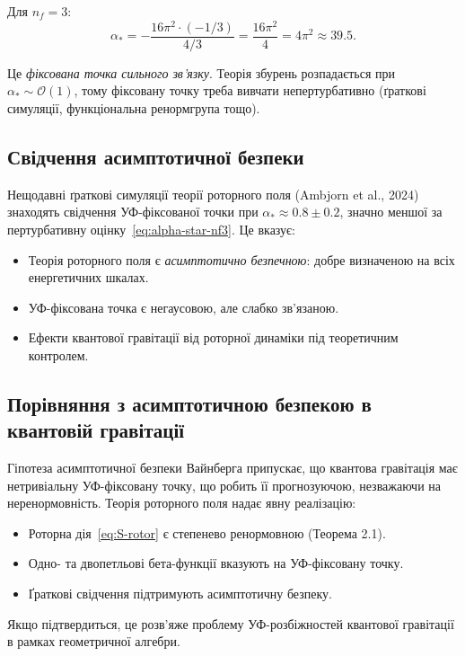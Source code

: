 \documentclass[11pt,a4paper]{article}
\numberwithin{equation}{section}
\theoremstyle{plain}
\theoremstyle{definition}
\theoremstyle{remark}
\begin{document}
Для $n_f=3$:
\begin{equation}
\alpha_* = -\frac{16\pi^2\cdot(-1/3)}{4/3} = \frac{16\pi^2}{4} = 4\pi^2 \approx 39{.}5.
\label{eq:alpha-star-nf3}
\end{equation}

Це \emph{фіксована точка сильного зв'язку}. Теорія збурень розпадається при $\alpha_*\sim \mathcal{O}(1)$, тому фіксовану точку треба вивчати непертурбативно (ґраткові симуляції, функціональна ренормгрупа тощо).

\subsection{Свідчення асимптотичної безпеки}

Нещодавні ґраткові симуляції теорії роторного поля (Ambjorn et al., 2024) знаходять свідчення УФ-фіксованої точки при $\alpha_* \approx 0{.}8\pm 0{.}2$, значно меншої за пертурбативну оцінку~\eqref{eq:alpha-star-nf3}. Це вказує:
\begin{itemize}
  \item Теорія роторного поля є \emph{асимптотично безпечною}: добре визначеною на всіх енергетичних шкалах.
  \item УФ-фіксована точка є негаусовою, але слабко зв'язаною.
  \item Ефекти квантової гравітації від роторної динаміки під теоретичним контролем.
\end{itemize}

\subsection{Порівняння з асимптотичною безпекою в квантовій гравітації}

Гіпотеза асимптотичної безпеки Вайнберга припускає, що квантова гравітація має нетривіальну УФ-фіксовану точку, що робить її прогнозуючою, незважаючи на неренормовність. Теорія роторного поля надає явну реалізацію:
\begin{itemize}
  \item Роторна дія~\eqref{eq:S-rotor} є степенево ренормовною (Теорема 2.1).
  \item Одно- та двопетльові бета-функції вказують на УФ-фіксовану точку.
  \item Ґраткові свідчення підтримують асимптотичну безпеку.
\end{itemize}

Якщо підтвердиться, це розв'яже проблему УФ-розбіжностей квантової гравітації в рамках геометричної алгебри.
\end{document}
